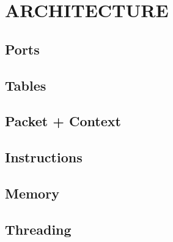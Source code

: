 \chapter{ARCHITECTURE}
\label{arch}

\section{Ports}
\label{arch:port}

\section{Tables}
\label{arch:tables}

\section{Packet + Context}
\label{arch:context}

\section{Instructions}
\label{arch:insn}

\section{Memory}
\label{arch:memory}

\section{Threading}
\label{arch:threading}
